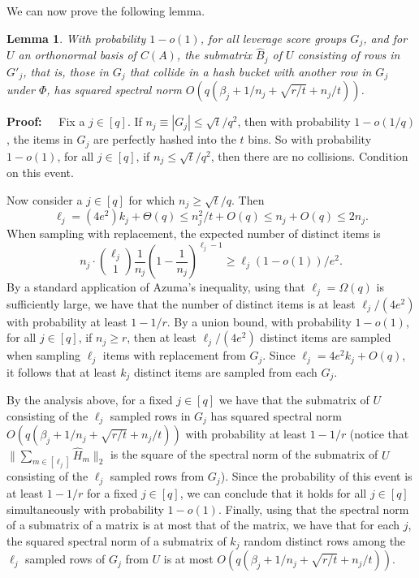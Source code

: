 \documentclass{sig-alternate}
\newtheorem{lemma}[theorem]{Lemma}
\def\FullBox{\hbox{\vrule width 8pt height 8pt depth 0pt}}
\def\qed{\ifmmode\qquad\FullBox\else{\unskip\nobreak\hfil
\penalty50\hskip1em\null\nobreak\hfil\FullBox
\parfillskip=0pt\finalhyphendemerits=0\endgraf}\fi}
\newenvironment{proof}{\begin{trivlist} \item {\bf Proof:~~}}
  {\qed\end{trivlist}}
\begin{document}
We can now prove the following lemma. 
\begin{lemma}\label{lem:collide norm}
With probability $1-o(1)$, for all leverage score groups $G_j$,
and for $U$ an orthonormal basis of $C(A)$, the submatrix $\hat B_j$
of $U$ consisting of rows in $G'_j$, that is, those in $G_j$ that
collide in a hash bucket with another
row in $G_j$ under $\Phi$, has squared spectral norm 
$O(q(\beta_j + 1/n_j + \sqrt{r/t}+ n_j/t))$.
\end{lemma}

\begin{proof}
Fix a $j \in [q]$. If $n_j \equiv |G_j| \leq \sqrt{t}/q^2$, then with probability $1-o(1/q)$, the items
in $G_j$ are perfectly hashed into the $t$ bins. So with probability $1-o(1)$, for all
$j \in [q]$, if $n_j \leq \sqrt{t}/q^2$, then there are no collisions. Condition on this event.

Now consider a $j \in [q]$ for which $n_j \geq \sqrt{t}/q$. Then 
$$\ell_j = (4e^2)k_j + \Theta(q) \leq n_j^2/t + O(q) \leq n_j + O(q) \leq 2n_j.$$
When sampling with replacement,
the expected number of distinct items is
$$n_j \cdot {\ell_j \choose 1} \frac{1}{n_j} \left (1- \frac{1}{n_j} \right )^{\ell_j - 1}
\geq \ell_j(1-o(1))/e^2.$$
By a standard
application of Azuma's inequality, using that $\ell_j = \Omega(q)$ is sufficiently large, 
we have that the number
of distinct items is at least $\ell_j/(4e^2)$ with probability at least $1-1/r$. By a union
bound, with probability $1-o(1)$, for all $j \in [q]$, if $n_j \geq r$, then at least 
$\ell_j/(4e^2)$ distinct items are sampled when sampling $\ell_j$ items with replacement from $G_j$. Since
$\ell_j = 4e^2k_j + O(q)$, it follows that at least $k_j$ distinct items are sampled from each $G_j$.

By the analysis above, for a fixed $j \in [q]$ we have that the submatrix of $U$ consisting of the $\ell_j$
sampled rows in $G_j$ has squared spectral norm $O(q(\beta_j + 1/n_j + \sqrt{r/t}+ n_j/t))$ with probability at least
$1-1/r$ (notice that $\|\sum_{m \in [\ell_j]} \hat{H}_m \|_2$ is the square of the spectral
norm of the submatrix of $U$ consisting of the $\ell_j$ sampled rows from $G_j$). Since the probability of 
this event is at least $1-1/r$ for a fixed $j \in [q]$, we can conclude that it holds for all $j \in [q]$
simultaneously with probability $1-o(1)$.
Finally, using that the spectral norm of a submatrix of a matrix is at most that of the matrix, we 
have that for each $j$, the squared spectral norm of a submatrix of $k_j$ random distinct rows among the $\ell_j$
sampled rows of $G_j$ from $U$ is at most $O(q(\beta_j + 1/n_j + \sqrt{r/t}+ n_j/t))$. 
\end{proof}
\end{document}
